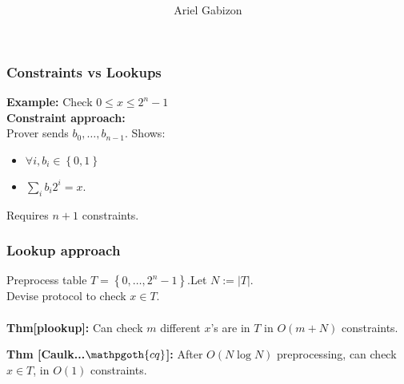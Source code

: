 \documentclass[shadesubsections,compress,14pt,mathserif]{beamer}
\title{ \bf \papertitle \\[0.72cm]}
\author{Ariel Gabizon}
\newcommand{\set}[1]{\ensuremath{\left\{#1\right\}}}
\newcommand{\nl}{\\ \pause \vspace{0.2in}}
\newcommand{\cq}{\mathpgoth{cq} }
\begin{document}
\boldmath
\begin{frame}
  \titlepage
\end{frame}
\begin{frame}
\frametitle{Constraints vs Lookups}
\textbf{Example:} Check $0\leq x \leq 2^n-1$\nl
\textbf{Constraint approach:}\\
Prover sends $b_0,\ldots,b_{n-1}$. Shows:
\begin{itemize}
 \item 
$\forall i, b_i\in \set{0,1}$
\item
$\sum_{i} b_i2^i =x$.\nl
\end{itemize}
Requires $n+1$ constraints.

\end{frame}
\begin{frame}
\frametitle{Lookup approach}
Preprocess table $T=\set{0,\ldots,2^n-1}$.Let $N:=|T|$. \\ \noindent 
Devise protocol to check $x\in T$.\nl
\textit{\color{blue}{Old results - good when amortized:}}\\ \noindent
\noindent
\textbf{Thm[plookup]:}  Can check $m$ different $x$'s are in $T$ in $O(m+ N)$
 constraints.\nl

\textit{\color{blue}{New results - prover doesn't pay for table size!!\\}}
\textbf{Thm [Caulk...$\cq$]:} After $O(N\log N)$ preprocessing, can check $x\in T$, in $O(1)$ constraints. 
\end{frame}
\end{document}
